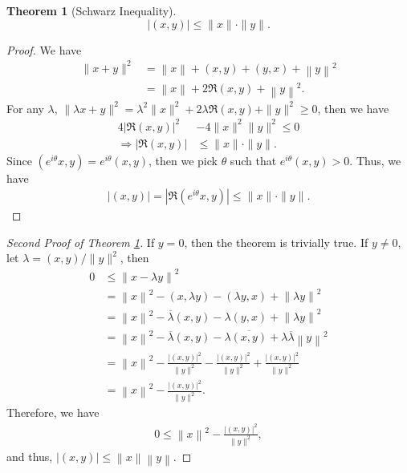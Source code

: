 \documentclass[10pt]{book}
\newtheorem{theorem}{Theorem}[chapter]
\theoremstyle{definition}
\numberwithin{equation}{chapter}
\begin{document}
\begin{theorem}[Schwarz Inequality]\label{schwarz_inequality}
$$\left|(x,y)\right|\leq \|x\|\cdot \|y\|.$$
\end{theorem}
\begin{proof}
We have 
\begin{align*}
    \|x+y\|^2 & = \left\|x\right\| + (x,y) + (y,x) + \left\|y\right\|^2 \\
    & = \left\|x\right\| + 2\Re (x,y) + \left\|y\right\|^2.
\end{align*}
For any $\lambda$, $\|\lambda x + y\|^2 = \lambda^2 \|x\|^2 + 2\lambda \Re (x,y) + \|y\|^2 \geq 0$, then we have
\begin{align*}
    4\left|\Re (x,y)\right|^2 & - 4\|x\|^2 \|y\|^2 \leq 0 \\
    \Rightarrow \left|\Re (x,y)\right| & \leq \|x\|\cdot \|y\|. 
\end{align*}
Since $\left(e^{i\theta}x,y\right) = e^{i\theta}(x,y)$, then we pick $\theta$ such that $e^{i\theta}(x,y) > 0$. Thus, we have
\begin{align*}
    \left|(x,y)\right| = \left|\Re (e^{i\theta}x,y)\right| \leq \|x\|\cdot \|y\|.
\end{align*}
\end{proof}

\medskip

\begin{proof}[Second Proof of Theorem \ref{schwarz_inequality}]
If $y = 0$, then the theorem is trivially true. If $y \neq 0$, let $\lambda = (x,y) / \|y\|^2$, then
\begin{align*}
    0 & \leq \left\|x - \lambda y\right\|^2 \\
    & = \left\|x\right\|^2 - (x,\lambda y) - (\lambda y,x) + \left\|\lambda y\right\|^2 \\
    & = \left\|x\right\|^2 - \overline{\lambda} (x,y) - \lambda (y,x) + \left\|\lambda y\right\|^2 \\
    & = \left\|x\right\|^2 - \overline{\lambda} (x,y) - \lambda \overline{(x,y)} +  \lambda \overline{\lambda} \left\|y\right\|^2 \\
    & = \left\|x\right\|^2 - \frac{\left|(x,y)\right|^2}{\|y\|^2} - \frac{\left|(x,y)\right|^2}{\|y\|^2} + \frac{\left|(x,y)\right|^2}{\|y\|^2} \\
    & = \left\|x\right\|^2 - \frac{\left|(x,y)\right|^2}{\|y\|^2}.
\end{align*}
Therefore, we have
\begin{align*}
    0 \leq \left\|x\right\|^2 - \frac{\left|(x,y)\right|^2}{\|y\|^2},
\end{align*}
and thus, $\left|(x,y)\right| \leq \left\|x\right\| \left\|y\right\|$.
\end{proof}
\end{document}
